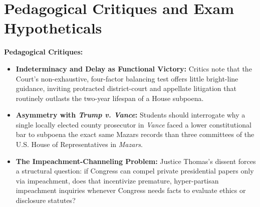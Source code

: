 \documentclass[12pt]{article}
\begin{document}
\section{Pedagogical Critiques and Exam Hypotheticals}
\textbf{Pedagogical Critiques:}
\begin{itemize}
  \item \textbf{Indeterminacy and Delay as Functional Victory:} Critics note that the Court's non-exhaustive, four-factor balancing test offers little bright-line guidance, inviting protracted district-court and appellate litigation that routinely outlasts the two-year lifespan of a House subpoena.
  \item \textbf{Asymmetry with \textit{Trump v. Vance}:} Students should interrogate why a single locally elected county prosecutor in \textit{Vance} faced a lower constitutional bar to subpoena the exact same Mazars records than three committees of the U.S. House of Representatives in \textit{Mazars}.
  \item \textbf{The Impeachment-Channeling Problem:} Justice Thomas's dissent forces a structural question: if Congress can compel private presidential papers only via impeachment, does that incentivize premature, hyper-partisan impeachment inquiries whenever Congress needs facts to evaluate ethics or disclosure statutes?
\end{itemize}
\end{document}
